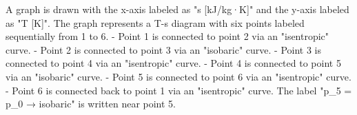 A graph is drawn with the x-axis labeled as "s [kJ/kg·K]" and the y-axis labeled as "T [K]". The graph represents a T-s diagram with six points labeled sequentially from 1 to 6.  
- Point 1 is connected to point 2 via an "isentropic" curve.  
- Point 2 is connected to point 3 via an "isobaric" curve.  
- Point 3 is connected to point 4 via an "isentropic" curve.  
- Point 4 is connected to point 5 via an "isobaric" curve.  
- Point 5 is connected to point 6 via an "isentropic" curve.  
- Point 6 is connected back to point 1 via an "isentropic" curve.  
The label "p_5 = p_0 → isobaric" is written near point 5.